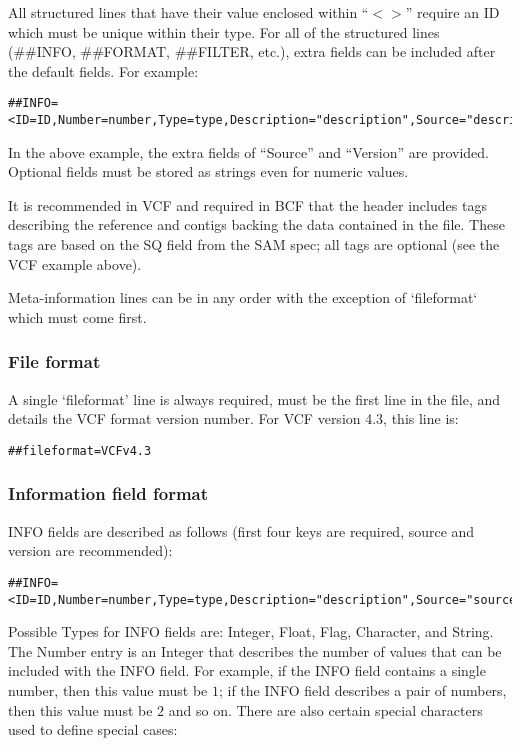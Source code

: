 \documentclass[8pt]{article}
\begin{document}
All structured lines that have their value enclosed within ``$<>$'' require an ID which must be unique within their type.
For all of the structured lines (\#\#INFO, \#\#FORMAT, \#\#FILTER, etc.), extra fields can be included after the default fields.
For example:
\begin{verbatim}
##INFO=<ID=ID,Number=number,Type=type,Description="description",Source="description",Version="128">
\end{verbatim}
In the above example, the extra fields of ``Source'' and ``Version'' are provided.
Optional fields must be stored as strings even for numeric values.

It is recommended in VCF and required in BCF that the header includes tags describing the reference and contigs backing the data contained in the file.
These tags are based on the SQ field from the SAM spec; all tags are optional (see the VCF example above).

Meta-information lines can be in any order with the exception of `fileformat` which must come first.


\subsubsection{File format}
A single `fileformat' line is always required, must be the first line in the file, and details the VCF format version number.
For VCF version 4.3, this line is:

\begin{verbatim}
##fileformat=VCFv4.3
\end{verbatim}


\subsubsection{Information field format}
INFO fields are described as follows (first four keys are required, source and version are recommended):

\begin{verbatim}
##INFO=<ID=ID,Number=number,Type=type,Description="description",Source="source",Version="version">
\end{verbatim}

Possible Types for INFO fields are: Integer, Float, Flag, Character, and String.
The Number entry is an Integer that describes the number of values that can be included with the INFO field.
For example, if the INFO field contains a single number, then this value must be $1$; if the INFO field describes a pair of numbers, then this value must be $2$ and so on.
There are also certain special characters used to define special cases:
\end{document}
